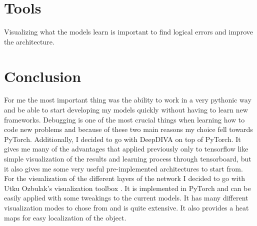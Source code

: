 \section{Tools}

Visualizing what the models learn is important to find logical errors and improve the architecture.

\section{Conclusion}

For me the most important thing was the ability to work in a very pythonic way and be able to start developing my models quickly without having to learn new frameworks. Debugging is one of the most crucial things when learning how to code new problems and because of these two main reasons my choice fell towards PyTorch. Additionally, I decided to go with DeepDIVA on top of PyTorch. It gives me many of the advantages that applied previously only to tensorflow like simple visualization of the results and learning process through tensorboard, but it also gives me some very useful pre-implemented architectures to start from. \\

For the visualization of the different layers of the network I decided to go with Utku Ozbulak's visualization toolbox \cite{viztoolbox}. It is implemented in PyTorch and can be easily applied with some tweakings to the current models. It has many different visualization modes to chose from and is quite extensive. It also provides a heat maps for easy localization of the object.
